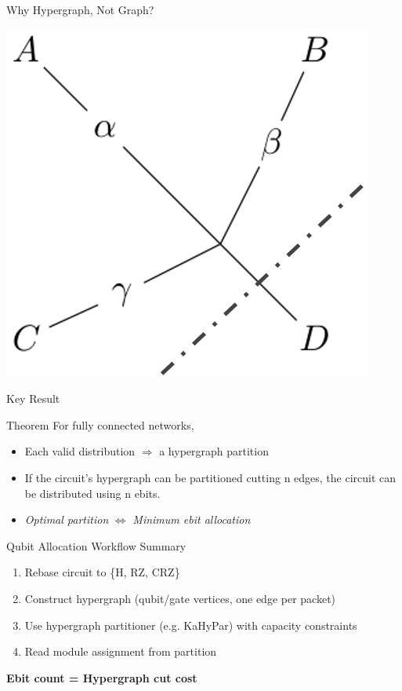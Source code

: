 \documentclass{beamer}
\begin{document}
\begin{frame}{Why Hypergraph, Not Graph?}
\begin{minipage}{.3\linewidth}
		\end{minipage}
		\begin{minipage}{.3\linewidth}
			\includegraphics[width=.9\textwidth]{figures/why3.png}
		\end{minipage}
	\end{frame}
	
	\begin{frame}{Key Result}
		\begin{block}{Theorem}
			For fully connected networks,
			\begin{itemize}
				\item Each valid distribution $\Rightarrow$ a hypergraph partition
				\item If the circuit’s hypergraph can be partitioned cutting n edges, the circuit can be distributed using n ebits.
				\item \textit{Optimal partition} $\Leftrightarrow$ \textit{Minimum ebit allocation}
			\end{itemize}
		\end{block}
	\end{frame}
	
	\begin{frame}{Qubit Allocation Workflow Summary}
		\begin{enumerate}
			\item Rebase circuit to \{H, RZ, CRZ\}
			\item Construct hypergraph (qubit/gate vertices, one edge per packet)
			\item Use hypergraph partitioner (e.g. KaHyPar) with capacity constraints
			\item Read module assignment from partition
		\end{enumerate}
		\vspace{0.5em}
		\textbf{Ebit count = Hypergraph cut cost}
	\end{frame}
	
\end{document}
